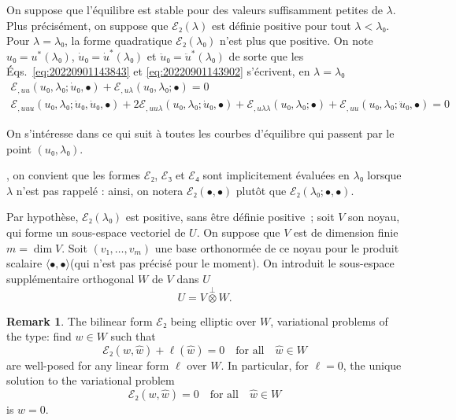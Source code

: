\documentclass[12pt, final]{scrartcl}
\theoremstyle{definition}
\newtheorem{remark}{Remark}
\newcommand{\E}{\mathcal E}
\begin{document}
On suppose que l'équilibre est stable pour des valeurs suffisamment petites de
$\lambda$. Plus précisément, on suppose que $\E₂(\lambda)$ est définie positive pour tout
$\lambda < \lambda₀$. Pour $\lambda = \lambda₀$, la forme quadratique $\E₂(\lambda₀)$ n'est plus que
positive. On note $u₀ = u^{\ast}(\lambda₀)$, $\dot{u}₀ = \dot{u}^\ast(\lambda₀)$ et
$\ddot{u}₀ = \ddot{u}^\ast(\lambda₀)$ de sorte que les
Éqs.~\eqref{eq:20220901143843} et \eqref{eq:20220901143902} s'écrivent, en
$\lambda = \lambda₀$
\begin{gather}
  \label{eq:20220901144331}
  \E_{,uu}(u₀, \lambda₀; \dot{u}₀, \bullet) + \E_{,u\lambda}(u₀, \lambda₀; \bullet) = 0\\
  \label{eq:20220901144335}
  \E_{,uuu}(u₀, \lambda₀; \dot{u}₀, \dot{u}₀, \bullet) + 2\E_{,uu\lambda}(u₀, \lambda₀; \dot{u}₀, \bullet) + \E_{,u\lambda\lambda}(u₀, \lambda₀; \bullet) + \E_{,uu}(u₀, \lambda₀; \ddot{u}₀, \bullet) = 0
\end{gather}

On s'intéresse dans ce qui suit à toutes les courbes d'équilibre qui passent par
le point $(u₀, \lambda₀)$.

, on
convient que les formes $\E₂$, $\E₃$ et $\E₄$ sont implicitement évaluées en
$\lambda₀$ lorsque $\lambda$ n'est pas rappelé : ainsi, on notera $\E₂(•, •)$ plutôt
que $\E₂(\lambda₀ ; •, •)$.

Par hypothèse, $\E₂(\lambda₀)$ est positive, sans être définie
positive~; soit $V$ son noyau, qui forme un sous-espace vectoriel de $U$. On
suppose que $V$ est de dimension finie $m = \dim V$. Soit
$(v₁, \ldots, v_m)$ une base orthonormée de ce noyau pour le produit scalaire
$〈 •, • 〉$(qui n'est pas précisé pour le moment). On introduit le
sous-espace supplémentaire orthogonal $W$ de $V$ dans $U$
\begin{equation}
  U = V \overset{\perp}{\otimes} W.
\end{equation}

\begin{remark}
  \label{rem:20220902095055}
  The bilinear form $\E₂$ being elliptic over $W$, variational problems of the
  type: find $w \in W$ such that
  \begin{equation}
    \E₂(w, \hat{w})+\ell(\hat{w}) = 0 \quad \text{for all} \quad \hat{w} \in W
  \end{equation}
  are well-posed for any linear form $\ell$ over $W$. In particular, for
  $\ell=0$, the unique solution to the variational problem
  \begin{equation}
    \E₂(w, \hat{w}) = 0 \quad \text{for all} \quad \hat{w} \in W
  \end{equation}
  is $w = 0$.
\end{remark}
\end{document}
